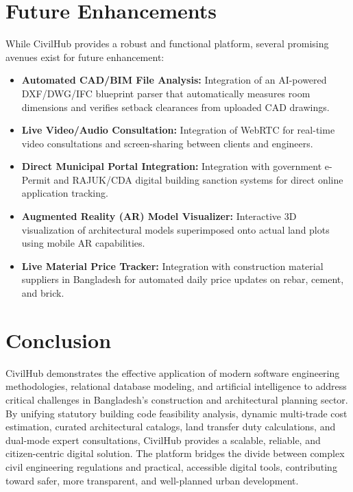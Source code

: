 \documentclass[12pt,a4paper]{article}
\begin{document}
\section{Future Enhancements}
While CivilHub provides a robust and functional platform, several promising avenues exist for future enhancement:
\begin{itemize}
    \item \textbf{Automated CAD/BIM File Analysis:} Integration of an AI-powered DXF/DWG/IFC blueprint parser that automatically measures room dimensions and verifies setback clearances from uploaded CAD drawings.
    \item \textbf{Live Video/Audio Consultation:} Integration of WebRTC for real-time video consultations and screen-sharing between clients and engineers.
    \item \textbf{Direct Municipal Portal Integration:} Integration with government e-Permit and RAJUK/CDA digital building sanction systems for direct online application tracking.
    \item \textbf{Augmented Reality (AR) Model Visualizer:} Interactive 3D visualization of architectural models superimposed onto actual land plots using mobile AR capabilities.
    \item \textbf{Live Material Price Tracker:} Integration with construction material suppliers in Bangladesh for automated daily price updates on rebar, cement, and brick.
\end{itemize}

\section{Conclusion}
CivilHub demonstrates the effective application of modern software engineering methodologies, relational database modeling, and artificial intelligence to address critical challenges in Bangladesh's construction and architectural planning sector. By unifying statutory building code feasibility analysis, dynamic multi-trade cost estimation, curated architectural catalogs, land transfer duty calculations, and dual-mode expert consultations, CivilHub provides a scalable, reliable, and citizen-centric digital solution. The platform bridges the divide between complex civil engineering regulations and practical, accessible digital tools, contributing toward safer, more transparent, and well-planned urban development.
\end{document}
